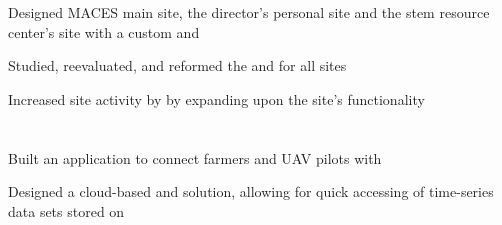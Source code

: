 \documentclass[]{hackathons}
\begin{document}
\begin{minipage}[t]{0.62\textwidth}
\begin{tightemize}
\item Designed MACES main site, the director's personal site and the stem resource center's site with a custom  and 
\item Studied, reevaluated, and reformed the  and  for all sites
\item Increased site activity by  by expanding upon the site's functionality
\end{tightemize}
\small


\section{}
\begin{tightemize}
\item Built an application to connect farmers and UAV pilots with 
\item Designed a cloud-based  and  solution, allowing for quick accessing of time-series data sets stored on 
\end{tightemize}
\medskip

%
%

\end{minipage} 
\hfill
\end{document}
